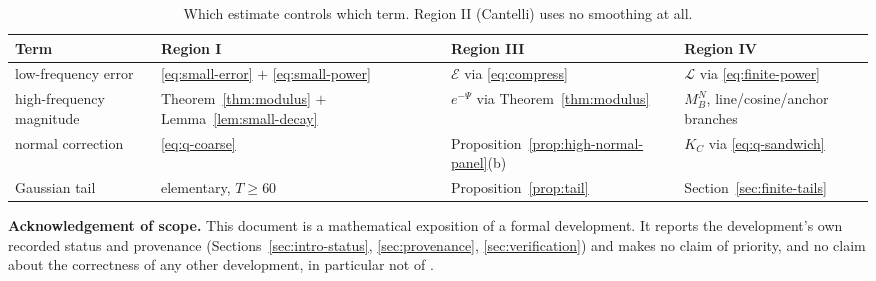 \documentclass[10pt,a4paper]{article}
\theoremstyle{plain}
\theoremstyle{definition}
\begin{document}
\begin{table}[ht]
\centering
\footnotesize
\begin{tabular}{@{}llll@{}}
\toprule
Term & Region I & Region III & Region IV \\
\midrule
low-frequency error
  & \eqref{eq:small-error} $+$ \eqref{eq:small-power}
  & $\mathcal E$ via \eqref{eq:compress}
  & $\mathcal L$ via \eqref{eq:finite-power} \\
high-frequency magnitude
  & Theorem~\ref{thm:modulus} $+$ Lemma~\ref{lem:small-decay}
  & $e^{-\Psi}$ via Theorem~\ref{thm:modulus}
  & $M_B^N$, line/cosine/anchor branches \\
normal correction
  & \eqref{eq:q-coarse}
  & Proposition~\ref{prop:high-normal-panel}(b)
  & $K_C$ via \eqref{eq:q-sandwich} \\
Gaussian tail
  & elementary, $T\ge60$
  & Proposition~\ref{prop:tail}
  & Section~\ref{sec:finite-tails} \\
\bottomrule
\end{tabular}
\caption{Which estimate controls which term. Region II (Cantelli) uses no
smoothing at all.}
\label{tab:terms}
\end{table}

\bigskip
\noindent\textbf{Acknowledgement of scope.} This document is a mathematical
exposition of a formal development. It reports the development's own recorded
status and provenance (Sections~\ref{sec:intro-status},
\ref{sec:provenance}, \ref{sec:verification}) and makes no claim of priority,
and no claim about the correctness of any other development, in particular not
of \cite{XiaoLi2026}.



\end{document}
